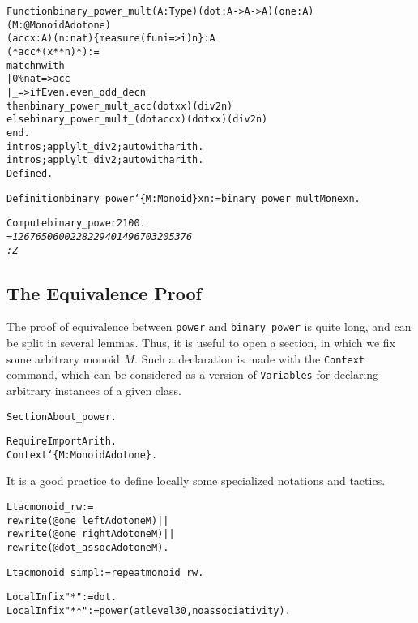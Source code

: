 \documentclass[a4]{report}
\begin{document}


\begin{alltt}
Function binary_power_mult (A:Type) (dot:A->A->A) (one:A) (M: @Monoid A dot one)
    (acc x:A)(n:nat)\{measure (fun i=>i) n\} : A 
  (* acc * (x ** n) *) :=
  match n with
  | 0\%nat => acc
  | _ => if  Even.even_odd_dec n
          then binary_power_mult  _   acc (dot x x) (div2 n)
          else binary_power_mult   _ (dot acc  x) (dot  x  x) (div2 n)
  end.
intros;apply lt_div2; auto with arith.
intros; apply lt_div2; auto with arith.
Defined.

Definition binary_power `\{M:Monoid\} x n := binary_power_mult M one x n.

Compute binary_power 2 100.\it\color{red}
= 1267650600228229401496703205376
     : Z
\end{alltt}

\subsection{The Equivalence Proof}\label{equiv-proof}

The proof of equivalence between \texttt{power} and \texttt{binary\_power} is quite
long, and can be split in several lemmas. 
Thus, it is useful to open a section, in which we fix some arbitrary monoid $M$.
Such a declaration is made with the \texttt{Context} command, which can be considered
as a version of \texttt{Variables} for declaring arbitrary instances of a given class.

\begin{alltt}
Section About_power.

Require Import Arith.
  Context `\{M:Monoid A dot one\}.
\end{alltt}

It is a good practice to define locally some specialized notations and tactics.

\begin{alltt}
  Ltac monoid_rw :=
    rewrite (@one_left A dot one M) || 
    rewrite (@one_right A dot one M)|| 
    rewrite (@dot_assoc A dot one M).

  Ltac monoid_simpl := repeat monoid_rw.

  Local Infix "*" := dot.
  Local Infix "**" := power (at level 30, no associativity).
\end{alltt}
\end{document}
